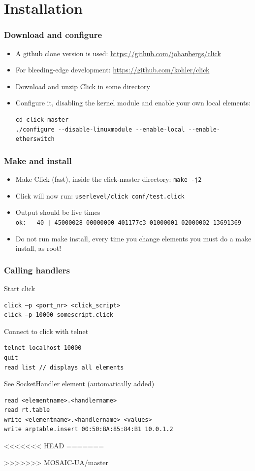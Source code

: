 \documentclass{beamer}
\begin{document}
\section{Installation}
\begin{frame}[fragile]
\frametitle{Download and configure}
\begin{itemize}
	\item A github clone version is used: \url{https://github.com/johanbergs/click}
	\item For bleeding-edge development: \url{https://github.com/kohler/click}
	\item Download and unzip Click in some directory
	\item Configure it, disabling the kernel module and enable your own local elements:
	\begin{lstlisting}
cd click-master
./configure --disable-linuxmodule --enable-local --enable-etherswitch
\end{lstlisting}
\end{itemize}

\end{frame}
\begin{frame}[fragile]
	\frametitle{Make and install}
\begin{itemize}
	\item Make Click (fast), inside the click-master directory: \lstinline!make -j2!
	\item Click will now run: \lstinline!userlevel/click conf/test.click!
	\item Output should be five times \\ \lstinline!ok:   40 | 45000028 00000000 401177c3 01000001 02000002 13691369!
	\item Do not run make install, every time you change elements you must do a make install, as root!
\end{itemize}	
\end{frame}

\begin{frame}[fragile]
	\frametitle{Calling handlers}
Start click
\begin{verbatim}
click –p <port_nr> <click_script>
click –p 10000 somescript.click
\end{verbatim}
Connect to click with telnet
\begin{verbatim}
telnet localhost 10000
quit
read list // displays all elements
\end{verbatim}
See SocketHandler element (automatically added)
\begin{verbatim}
read <elementname>.<handlername>
read rt.table
write <elementname>.<handlername> <values>
write arptable.insert 00:50:BA:85:84:B1 10.0.1.2
\end{verbatim}
\end{frame}
<<<<<<< HEAD
=======

>>>>>>> MOSAIC-UA/master
\end{document}
